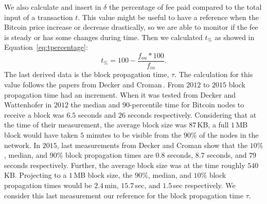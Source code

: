 \documentclass[USenglish]{uit-thesis}
\begin{document}
We also calculate and insert in $\delta$ the percentage of fee paid
compared to the total input of a transaction $t$. This
value might be useful to have a reference when the
Bitcoin price increase or decrease drastically, so we are
able to monitor if the fee is steady or has some changes
during time. Then we calculated $t_\%$ as showed in
Equation~\ref{eq:tpercentage}:
\begin{equation}
\label{eq:tpercentage}
t_\% = 100 - \frac{f_{ou} *100}{f_{in}}.
\end{equation}
The last derived data is the block propagation time, $\tau$. The calculation
for this value follows the papers from Decker and
Croman\,\cite{Decker2013IPBN, croman2016}. From $2012$
to $2015$ block propagation time had an increment.
When it was tested from Decker and Wattenhofer in
$2012$ the median and $90$-percentile time for Bitcoin
nodes to receive a block was $6.5$ seconds and
$26$ seconds respectively. Considering that
at the time of their measurement, the average block size was $87$\,KB,
a full $1$\,MB block would have taken $5$ minutes to be
visible from the $90\%$ of the nodes in the network.
In $2015$, last measurements from Decker and Croman show
that the $10\%$, median, and $90\%$ block propagation times are
$0.8$ seconds, $8.7$ seconds, and $79$ seconds respectively.
Further, the average block size was at the time roughly $540$\,KB.
Projecting to a $1$\,MB block size, the $90\%$, median, and
$10\%$ block propagation times would be $2.4$\,min, $15.7$\,sec,
and $1.5$\,sec respectively. We consider this last measurement
our reference for the block propagation time $\tau$.

%
\end{document}
